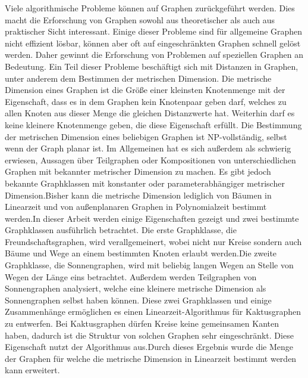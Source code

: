 Viele algorithmische Probleme können auf Graphen zurückgeführt werden. Dies macht die Erforschung von Graphen sowohl aus theoretischer als auch aus praktischer Sicht interessant. Einige dieser Probleme sind für allgemeine Graphen nicht effizient lösbar, können aber oft auf eingeschränkten Graphen schnell gelöst werden. Daher gewinnt die Erforschung von Problemen auf speziellen Graphen an Bedeutung. 
Ein Teil dieser Probleme beschäftigt sich mit Distanzen in Graphen, unter anderem dem Bestimmen der metrischen Dimension.\newline\newline
Die metrische Dimension eines Graphen ist die Größe einer kleinsten Knotenmenge mit der Eigenschaft, dass es in dem Graphen kein Knotenpaar geben darf, welches zu allen Knoten aus dieser Menge die gleichen Distanzwerte hat. Weiterhin darf es keine kleinere Knotenmenge geben, die diese Eigenschaft erfüllt.\newline\newline 
Die Bestimmung der metrischen Dimension eines beliebigen Graphen ist NP-vollständig, selbst wenn der Graph planar ist. Im Allgemeinen hat es sich außerdem als schwierig erwiesen, Aussagen über Teilgraphen oder Kompositionen von unterschiedlichen Graphen mit bekannter metrischer Dimension zu machen. Es gibt jedoch bekannte Graphklassen mit konstanter oder parameterabhängiger metrischer Dimension.\newline\newline Bisher kann die metrische Dimension lediglich von Bäumen in Linearzeit und von außenplanaren Graphen in Polynomialzeit bestimmt werden.\newline\newline In dieser Arbeit werden einige Eigenschaften gezeigt und zwei bestimmte Graphklassen ausführlich betrachtet. Die erste Graphklasse, die Freundschaftsgraphen, wird verallgemeinert, wobei nicht nur Kreise sondern auch Bäume und Wege an einem bestimmten Knoten erlaubt werden.\newline Die zweite Graphklasse, die Sonnengraphen, wird mit beliebig langen Wegen an Stelle von Wegen der Länge eins betrachtet. Außerdem werden Teilgraphen von Sonnengraphen analysiert, welche eine kleinere metrische Dimension als Sonnengraphen selbst haben können.\newline\newline 
Diese zwei Graphklassen und einige Zusammenhänge ermöglichen es einen Linearzeit-Algorithmus für Kaktusgraphen zu entwerfen. Bei Kaktusgraphen dürfen Kreise keine gemeinsamen Kanten haben, dadurch ist die Struktur von solchen Graphen sehr eingeschränkt. Diese Eigenschaft nutzt der Algorithmus aus.\newline\newline Durch dieses Ergebnis wurde die Menge der Graphen für welche die metrische Dimension in Linearzeit bestimmt werden kann erweitert.

